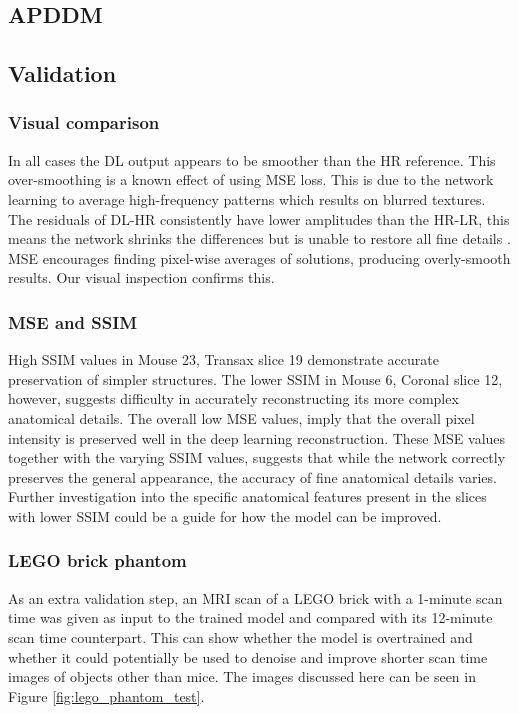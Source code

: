 \documentclass[twocolumn]{article}
\begin{document}
\subsection{APDDM}

\subsection{Validation}

\subsubsection{Visual comparison}
In all cases the DL output appears to be smoother than the HR reference. This over-smoothing is a known effect of using MSE loss. 
This is due to the network learning to average high-frequency patterns which results on blurred textures. 
The residuals of DL-HR consistently have lower amplitudes than the HR-LR, this means the network shrinks the differences but is unable to restore all fine details \cite{MSE}. 
MSE encourages finding pixel-wise averages of solutions, producing overly-smooth results. Our visual inspection confirms this.

\subsubsection{MSE and SSIM}
High SSIM values in Mouse 23, Transax slice 19 demonstrate accurate preservation of simpler structures. The lower SSIM in Mouse 6, Coronal slice 12, however, suggests difficulty in accurately reconstructing its more complex anatomical details. The overall low MSE values, imply that the overall pixel intensity is preserved well in the deep learning reconstruction.  
These MSE values together with the varying SSIM values, suggests that while the network correctly preserves the general appearance, the accuracy of fine anatomical details varies. Further investigation into the specific anatomical features present in the slices with lower SSIM could be a guide for how the model can be improved.

\subsubsection{LEGO brick phantom}
As an extra validation step, an MRI scan of a LEGO brick with a 1-minute scan time was given as input to the trained model and compared with its 12-minute scan time counterpart. This can show whether the model is overtrained and whether it could potentially be used to denoise and improve shorter scan time images of objects other than mice. The images discussed here can be seen in Figure \ref{fig:lego_phantom_test}.
\end{document}

